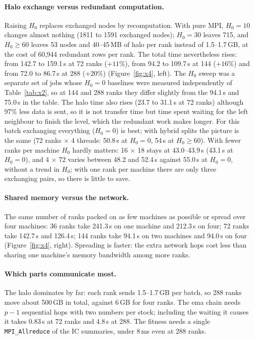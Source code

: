 \documentclass[11pt,a4paper]{article}
\newcommand{\code}[1]{\texttt{#1}}
\begin{document}
\paragraph{Halo exchange versus redundant computation.} Raising $H_0$ replaces exchanged nodes by recomputation. With pure MPI, $H_0=10$ changes almost nothing (1811 to 1591 exchanged nodes); $H_0=30$ leaves 715, and $H_0\ge60$ leaves 53 nodes and 40--45\,MB of halo per rank instead of 1.5--1.7\,GB, at the cost of 60{,}944 redundant rows per rank. The total time nevertheless rises: from 142.7 to 159.1\,s at 72 ranks ($+11\%$), from 94.2 to 109.7\,s at 144 ($+16\%$) and from 72.0 to 86.7\,s at 288 ($+20\%$) (Figure~\ref{fig:x4}, left). The $H_0$ sweep was a separate set of jobs whose $H_0=0$ baselines were measured independently of Table~\ref{tab:x2}, so at 144 and 288 ranks they differ slightly from the 94.1\,s and 75.0\,s in the table. The halo time also rises (23.7 to 31.1\,s at 72 ranks) although 97\% less data is sent, so it is not transfer time but time spent waiting for the left neighbour to finish the level, which the redundant work makes longer. For this batch exchanging everything ($H_0=0$) is best; with hybrid splits the picture is the same (72 ranks $\times$ 4 threads: 50.8\,s at $H_0=0$, 54\,s at $H_0\ge60$). With fewer ranks per machine $H_0$ hardly matters: 16 $\times$ 18 stays at 43.0--43.9\,s (43.1\,s at $H_0=0$), and 4 $\times$ 72 varies between 48.2 and 52.4\,s against 55.0\,s at $H_0=0$, without a trend in $H_0$; with one rank per machine there are only three exchanging pairs, so there is little to save.

\paragraph{Shared memory versus the network.} The same number of ranks packed on as few machines as possible or spread over four machines: 36 ranks take 241.3\,s on one machine and 212.3\,s on four; 72 ranks take 142.7\,s and 126.4\,s; 144 ranks take 94.1\,s on two machines and 94.0\,s on four (Figure~\ref{fig:x4}, right). Spreading is faster: the extra network hops cost less than sharing one machine's memory bandwidth among more ranks.

\paragraph{Which parts communicate most.} The halo dominates by far: each rank sends 1.5--1.7\,GB per batch, so 288 ranks move about 500\,GB in total, against 6\,GB for four ranks. The ema chain needs $p-1$ sequential hops with two numbers per stock; including the waiting it causes it takes 0.83\,s at 72 ranks and 4.8\,s at 288. The fitness needs a single \code{MPI\_Allreduce} of the IC summaries, under 8\,ms even at 288 ranks.
\end{document}
